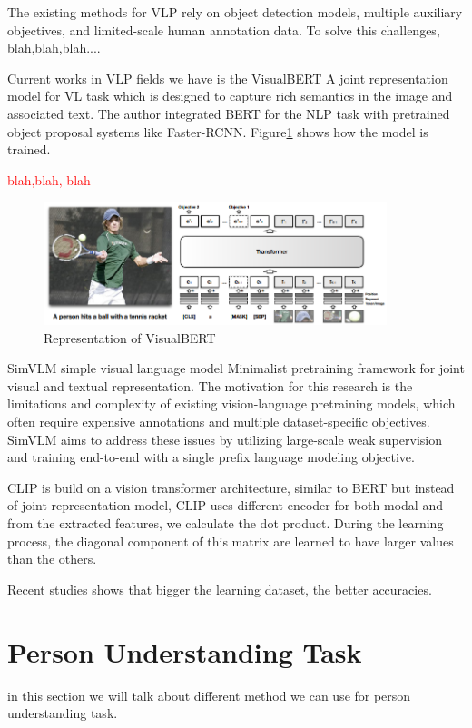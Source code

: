 The existing methods for VLP rely on object detection models, multiple auxiliary objectives, and limited-scale human annotation data. To solve this challenges, blah,blah,blah....

Current works in VLP fields we have is the 
VisualBERT
A joint representation model for VL task which is designed to capture rich semantics in the image and associated text. The author integrated BERT for the NLP task with pretrained object proposal systems like Faster-RCNN. Figure\ref{fig:visualvert} shows how the model is trained. 

\textcolor{red}{blah,blah, blah}
\begin{figure}[htbp]
    \includegraphics[width=10cm]{img/VisualBERT.png}
    \caption{Representation of VisualBERT}\label{fig:visualvert}
\end{figure}


SimVLM simple visual language model
Minimalist pretraining framework for joint visual and textual representation. The motivation for this research is the limitations and complexity of existing vision-language pretraining models, which often require expensive annotations and multiple dataset-specific objectives. SimVLM aims to address these issues by utilizing large-scale weak supervision and training end-to-end with a single prefix language modeling objective.


CLIP is build on a vision transformer architecture, similar to BERT but instead of joint representation model, CLIP uses different encoder for both modal and from the extracted features, we calculate the dot product. During the learning process, the diagonal component of this matrix are learned to have larger values than the others.

Recent studies shows that bigger the learning dataset, the better accuracies. 

\section{Person Understanding Task}
in this section we will talk about different method we can use for person understanding task. 

